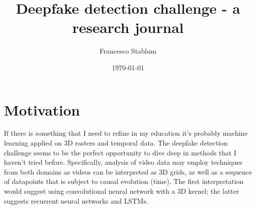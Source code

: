 \documentclass{article}
\title{Deepfake detection challenge - a research journal}
\author{Francesco Stablum}
\date{\today}
\begin{document}
\maketitle

\section{Motivation}

If there is something that I need to refine in my education it's probably
machine learning applied on 3D rasters and temporal data.
The deepfake detection challenge seems to be the perfect opportunity
to dive deep in methods that I haven't tried before.
Specifically, analysis of video data may employ techniques from both domains
as videos can be interpreted as 3D grids, as well as a sequence of datapoints that
is subject to causal evolution (time). The first interpretation would suggest using
convolutional neural network with a 3D kernel; the latter suggests recurrent neural networks
and LSTMs.




{}

\end{document}
